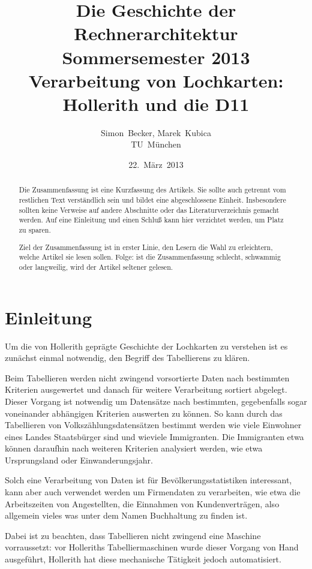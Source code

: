 \documentclass[parskip=half]{scrartcl}
\author{Simon~Becker, Marek~Kubica\\TU~München}
\title{Die Geschichte der Rechnerarchitektur\\
Sommersemester 2013\\
Verarbeitung von Lochkarten: Hollerith und die D11}
\date{22.~März~2013}
\begin{document}
\maketitle

\begin{abstract}

Die Zusammenfassung ist eine Kurzfassung des Artikels. Sie sollte
auch getrennt vom restlichen Text verständlich sein
und bildet eine abgeschlossene Einheit. Insbesondere sollten keine
Verweise auf andere Abschnitte
oder das Literaturverzeichnis gemacht werden. Auf eine Einleitung
und einen Schluß kann hier verzichtet werden, um Platz zu sparen.

Ziel der Zusammenfassung ist in erster Linie, den Lesern die Wahl
zu erleichtern, welche Artikel sie lesen sollen. Folge: ist die
Zusammenfassung schlecht, schwammig oder langweilig, wird der
Artikel seltener gelesen.
\end{abstract}

\section{Einleitung}
\label{sec:einleitung}

Um die von Hollerith geprägte Geschichte der Lochkarten zu verstehen ist es
zunächst einmal notwendig, den Begriff des Tabellierens zu klären.

Beim Tabellieren werden nicht zwingend vorsortierte Daten nach bestimmten
Kriterien ausgewertet und danach für weitere Verarbeitung sortiert abgelegt.
Dieser Vorgang ist notwendig um Datensätze nach bestimmten, gegebenfalls sogar
voneinander abhängigen Kriterien auswerten zu können. So kann durch das
Tabellieren von Volkszählungsdatensätzen bestimmt werden wie viele Einwohner
eines Landes Staatsbürger sind und wieviele Immigranten. Die Immigranten etwa
können daraufhin nach weiteren Kriterien analysiert werden, wie etwa
Ursprungsland oder Einwanderungsjahr.

Solch eine Verarbeitung von Daten ist für Bevölkerungsstatistiken interessant,
kann aber auch verwendet werden um Firmendaten zu verarbeiten, wie etwa die
Arbeitszeiten von Angestellten, die Einnahmen von Kundenverträgen, also
allgemein vieles was unter dem Namen Buchhaltung zu finden ist.

Dabei ist zu beachten, dass Tabellieren nicht zwingend eine Maschine
vorraussetzt: vor Holleriths Tabelliermaschinen wurde dieser Vorgang von Hand
ausgeführt, Hollerith hat diese mechanische Tätigkeit jedoch automatisiert.
\end{document}

